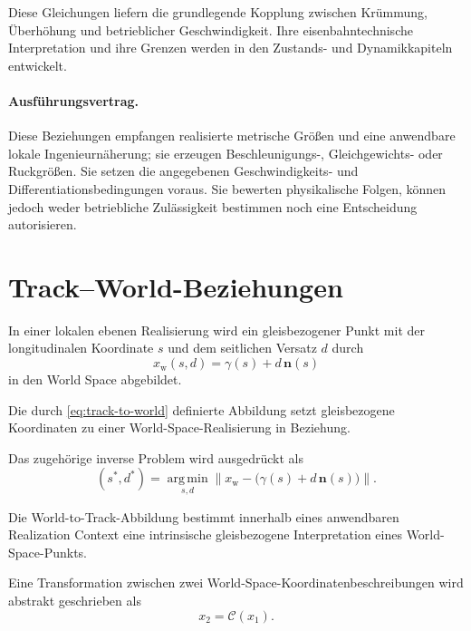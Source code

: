 Diese Gleichungen liefern die grundlegende Kopplung zwischen Krümmung,
Überhöhung und betrieblicher Geschwindigkeit. Ihre eisenbahntechnische
Interpretation und ihre Grenzen werden in den Zustands- und Dynamikkapiteln
entwickelt.

\paragraph{Ausführungsvertrag.}
Diese Beziehungen empfangen realisierte metrische Größen und eine anwendbare
lokale Ingenieurnäherung; sie erzeugen Beschleunigungs-, Gleichgewichts- oder
Ruckgrößen. Sie setzen die angegebenen Geschwindigkeits- und
Differentiationsbedingungen voraus. Sie bewerten physikalische Folgen, können
jedoch weder betriebliche Zulässigkeit bestimmen noch eine Entscheidung
autorisieren.

\section{Track--World-Beziehungen}

In einer lokalen ebenen Realisierung wird ein gleisbezogener Punkt mit der
longitudinalen Koordinate \(s\) und dem seitlichen Versatz \(d\) durch
\begin{equation}
x_{\mathrm w}(s,d)
=
\gamma(s)+d\,\mathbf n(s)
\label{eq:track-to-world}
\end{equation}
in den World Space abgebildet.

\begin{definition}
\label{def:track-to-world}
Die durch \cref{eq:track-to-world} definierte Abbildung setzt gleisbezogene
Koordinaten zu einer World-Space-Realisierung in Beziehung.
\end{definition}

Das zugehörige inverse Problem wird ausgedrückt als
\begin{equation}
(s^\ast,d^\ast)
=
\operatorname*{arg\,min}_{s,d}
\left\|
x_{\mathrm w}-\bigl(\gamma(s)+d\,\mathbf n(s)\bigr)
\right\|.
\label{eq:world-to-track}
\end{equation}

\begin{definition}
\label{def:world-to-track}
Die World-to-Track-Abbildung bestimmt innerhalb eines anwendbaren Realization
Context eine intrinsische gleisbezogene Interpretation eines
World-Space-Punkts.
\end{definition}

Eine Transformation zwischen zwei World-Space-Koordinatenbeschreibungen wird
abstrakt geschrieben als
\begin{equation}
x_2=\mathcal C(x_1).
\label{eq:coordinate-transformation}
\end{equation}

